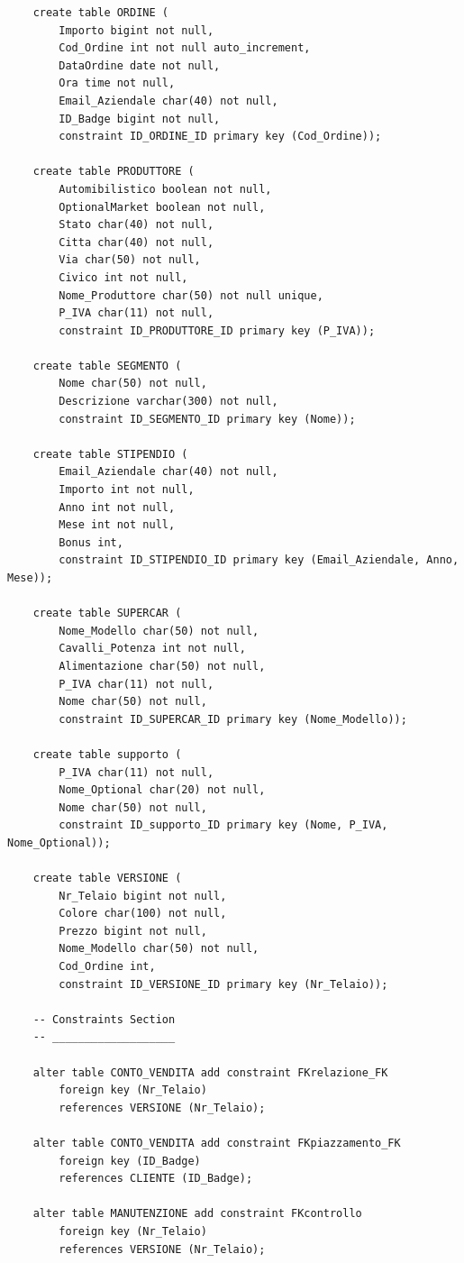 \documentclass[11pt]{article}
\begin{document}
\begin{lstlisting}
    create table ORDINE (
        Importo bigint not null,
        Cod_Ordine int not null auto_increment,
        DataOrdine date not null,
        Ora time not null,
        Email_Aziendale char(40) not null,
        ID_Badge bigint not null,
        constraint ID_ORDINE_ID primary key (Cod_Ordine));

    create table PRODUTTORE (
        Automibilistico boolean not null,
        OptionalMarket boolean not null,
        Stato char(40) not null,
        Citta char(40) not null,
        Via char(50) not null,
        Civico int not null,
        Nome_Produttore char(50) not null unique,
        P_IVA char(11) not null,
        constraint ID_PRODUTTORE_ID primary key (P_IVA));

    create table SEGMENTO (
        Nome char(50) not null,
        Descrizione varchar(300) not null,
        constraint ID_SEGMENTO_ID primary key (Nome));

    create table STIPENDIO (
        Email_Aziendale char(40) not null,
        Importo int not null,
        Anno int not null,
        Mese int not null,
        Bonus int,
        constraint ID_STIPENDIO_ID primary key (Email_Aziendale, Anno, Mese));

    create table SUPERCAR (
        Nome_Modello char(50) not null,
        Cavalli_Potenza int not null,
        Alimentazione char(50) not null,
        P_IVA char(11) not null,
        Nome char(50) not null,
        constraint ID_SUPERCAR_ID primary key (Nome_Modello));

    create table supporto (
        P_IVA char(11) not null,
        Nome_Optional char(20) not null,
        Nome char(50) not null,
        constraint ID_supporto_ID primary key (Nome, P_IVA, Nome_Optional));

    create table VERSIONE (
        Nr_Telaio bigint not null,
        Colore char(100) not null,
        Prezzo bigint not null,
        Nome_Modello char(50) not null,
        Cod_Ordine int,
        constraint ID_VERSIONE_ID primary key (Nr_Telaio));

    -- Constraints Section
    -- ___________________ 

    alter table CONTO_VENDITA add constraint FKrelazione_FK
        foreign key (Nr_Telaio)
        references VERSIONE (Nr_Telaio);

    alter table CONTO_VENDITA add constraint FKpiazzamento_FK
        foreign key (ID_Badge)
        references CLIENTE (ID_Badge);

    alter table MANUTENZIONE add constraint FKcontrollo
        foreign key (Nr_Telaio)
        references VERSIONE (Nr_Telaio);


\end{lstlisting}
\end{document}
